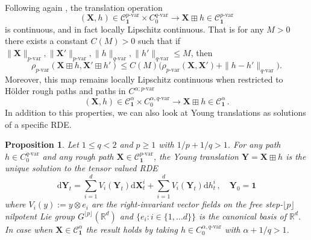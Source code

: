 \documentclass[12pt,a4paper]{article}
\numberwithin{equation}{section}
\def\bR{\mathbb{R}}\def\bS{\mathbb{S}}
\theoremstyle{plain}
\newtheorem{proposition}[theorem]{Proposition}
\theoremstyle{definition}
\theoremstyle{remark}
\begin{document}
Following again \cite[Theorem 9.33]{frizbook}, the translation operation 
\[(\mathbf{X}, h)\in  \mathcal{C}^{p\text{-var}}_{\mathbf{1}} \times C^{q\text{-var}}_0 \to \mathbf{X} \boxplus h \in \mathcal{C}^{p\text{-var}}_{\mathbf{1}}\]
 is continuous, and in fact locally Lipschitz continuous. That is for any $M > 0$ there exists a constant $C(M) > 0$ such that if 
$\|\mathbf{X}\|_{p\text{-var}}, \|\mathbf{X}'\|_{p\text{-var}}, \|h\|_{q\text{-var}}, \|h'\|_{q\text{-var}} \le M$, then
\begin{equation}\label{eq_loc_Lip}
\rho_{p\text{-var}}(\mathbf{X}\boxplus h, \mathbf{X}'\boxplus h') \le C(M) \bigl( \rho_{p\text{-var}}(\mathbf{X},\mathbf{X}') + \|h-h'\|_{q\text{-var}} \bigr).
\end{equation}
Moreover, this map remains locally Lipschitz continuous when restricted to H\"older rough paths and paths in $C^{\alpha; p\text{-var}}$
\[(\mathbf{X}, h) \in \mathcal{C}^{\alpha}_{\mathbf{1}} \times C^{\alpha,q\text{-var}}_0 \to \mathbf{X} \boxplus h \in \mathcal{C}^{\alpha}_{\mathbf{1}}\,.\] 
In addition to this properties, we can also look at Young translations as solutions of a specific RDE.
\begin{proposition}
Let $1\le q < 2$ and $p \ge 1$ with $1/p + 1/q > 1$. For any path \(h \in C^{q\text{-var}}_0\) and any  rough path \(\mathbf{X} \in \mathcal{C}^{p\text{-var}}_{\mathbf{1}}\), the  Young translation $\mathbf{Y}=\mathbf{X} \boxplus h$ is the unique solution to the tensor valued RDE 
\begin{equation}\label{eq:RDE_translation}
\mathrm{d}\mathbf{Y}_t=  \sum_{i=1}^d  V_i(\mathbf{Y}_t)\mathrm{d}\mathbf{X}^i_t+ \sum_{i=1}^d V_i(\mathbf{Y}_t)\mathrm{d}h^i_t\,,\quad  \mathbf{Y}_0=\mathbf{1}
\end{equation}
where  $V_i(y):=y\otimes e_i$ are the right-invariant vector fields on the free step-$\lfloor p \rfloor$
nilpotent Lie group $G^{\lfloor p \rfloor}(\bR^d)$ and $\{e_i\colon i\in \{1,\ldots d\}\}$ is the canonical basis of $\mathbb{R}^d$. In case when $ \mathbf{X}\in \mathcal{C}^{\alpha}_{\mathbf{1}} $  the result holds by taking $h\in C^{\alpha,q\text{-var}}_0$ with $\alpha+ 1/q>1$.
\end{proposition}
\end{document}
